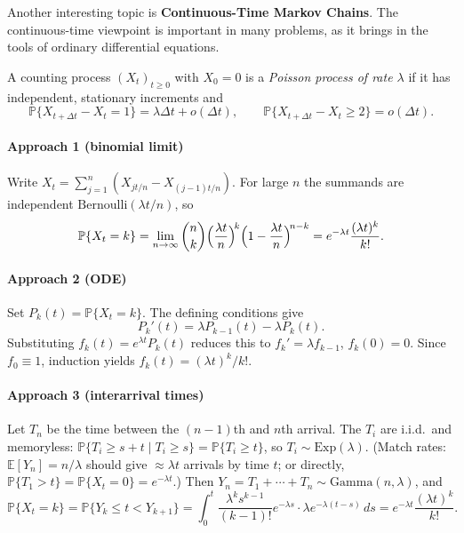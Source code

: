 Another interesting topic is \textbf{Continuous-Time Markov Chains}. The continuous-time viewpoint is important in many problems, as it brings in the tools of ordinary differential equations.
\begin{exam}
    A counting process $(X_t)_{t\ge0}$ with $X_0=0$ is a \emph{Poisson process of rate $\lambda$} if it has independent, stationary increments and
\[
  \mathbb P\{X_{t+\Delta t} - X_t = 1\} = \lambda\Delta t + o(\Delta t), \qquad
  \mathbb P\{X_{t+\Delta t} - X_t \ge 2\} = o(\Delta t).
\]
 
\paragraph{Approach 1 (binomial limit)}
Write $X_t = \sum_{j=1}^{n}(X_{jt/n}-X_{(j-1)t/n})$.  For large $n$ the summands are independent $\mathrm{Bernoulli}(\lambda t/n)$, so
\[
  \mathbb P\{X_t=k\} = \lim_{n\to\infty}\binom{n}{k}\Bigl(\frac{\lambda t}{n}\Bigr)^{\!k}\Bigl(1-\frac{\lambda t}{n}\Bigr)^{\!n-k} = e^{-\lambda t}\frac{(\lambda t)^k}{k!}.
\]
 
\paragraph{Approach 2 (ODE)}
Set $P_k(t)=\mathbb P\{X_t=k\}$.  The defining conditions give 
\[
P_k'(t)=\lambda P_{k-1}(t)-\lambda P_k(t).
\]
Substituting $f_k(t)=e^{\lambda t}P_k(t)$ reduces this to $f_k'=\lambda f_{k-1}$, $f_k(0)=0$.  Since $f_0\equiv1$, induction yields $f_k(t)=(\lambda t)^k/k!$.

\paragraph{Approach 3 (interarrival times)}
Let $T_n$ be the time between the $(n{-}1)$th and $n$th arrival.  The $T_i$ are i.i.d.\ and memoryless: $\mathbb P\{T_i\ge s+t\mid T_i\ge s\}=\mathbb P\{T_i\ge t\}$, so $T_i\sim\mathrm{Exp}(\lambda)$.  (Match rates: $\mathbb E[Y_n]=n/\lambda$ should give $\approx\!\lambda t$ arrivals by time $t$; or directly, $\mathbb P\{T_1>t\}=\mathbb P\{X_t=0\}=e^{-\lambda t}$.)  Then $Y_n=T_1+\cdots+T_n\sim\mathrm{Gamma}(n,\lambda)$, and
\[
  \mathbb P\{X_t=k\}=\mathbb P\{Y_k\le t < Y_{k+1}\}=\int_0^t \frac{\lambda^k s^{k-1}}{(k{-}1)!}e^{-\lambda s}\cdot\lambda e^{-\lambda(t-s)}\,ds = e^{-\lambda t}\frac{(\lambda t)^k}{k!}.
\]
\end{exam}

